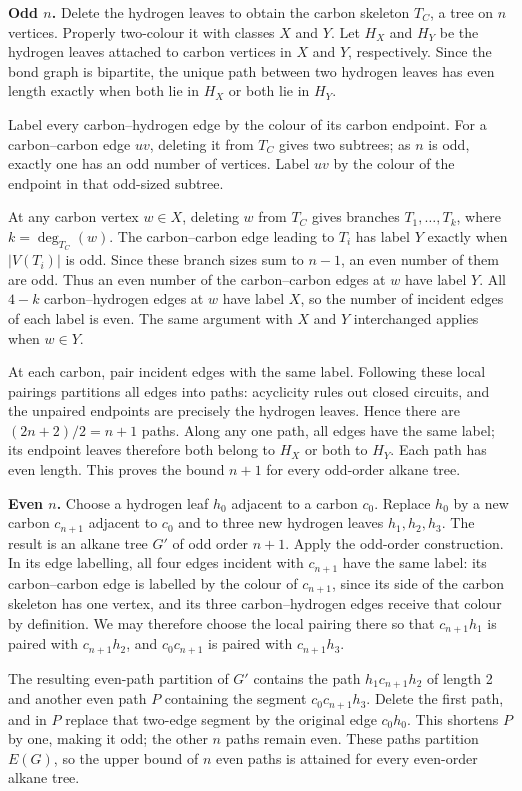 \textbf{Odd $n$.} Delete the hydrogen leaves to obtain the carbon skeleton $T_C$, a tree on $n$ vertices. Properly two-colour it with classes $X$ and $Y$. Let $H_X$ and $H_Y$ be the hydrogen leaves attached to carbon vertices in $X$ and $Y$, respectively. Since the bond graph is bipartite, the unique path between two hydrogen leaves has even length exactly when both lie in $H_X$ or both lie in $H_Y$.

Label every carbon--hydrogen edge by the colour of its carbon endpoint. For a carbon--carbon edge $uv$, deleting it from $T_C$ gives two subtrees; as $n$ is odd, exactly one has an odd number of vertices. Label $uv$ by the colour of the endpoint in that odd-sized subtree.

At any carbon vertex $w\in X$, deleting $w$ from $T_C$ gives branches $T_1,\ldots,T_k$, where $k=\deg_{T_C}(w)$. The carbon--carbon edge leading to $T_i$ has label $Y$ exactly when $|V(T_i)|$ is odd. Since these branch sizes sum to $n-1$, an even number of them are odd. Thus an even number of the carbon--carbon edges at $w$ have label $Y$. All $4-k$ carbon--hydrogen edges at $w$ have label $X$, so the number of incident edges of each label is even. The same argument with $X$ and $Y$ interchanged applies when $w\in Y$.

At each carbon, pair incident edges with the same label. Following these local pairings partitions all edges into paths: acyclicity rules out closed circuits, and the unpaired endpoints are precisely the hydrogen leaves. Hence there are $(2n+2)/2=n+1$ paths. Along any one path, all edges have the same label; its endpoint leaves therefore both belong to $H_X$ or both to $H_Y$. Each path has even length. This proves the bound $n+1$ for every odd-order alkane tree.

\textbf{Even $n$.} Choose a hydrogen leaf $h_0$ adjacent to a carbon $c_0$. Replace $h_0$ by a new carbon $c_{n+1}$ adjacent to $c_0$ and to three new hydrogen leaves $h_1,h_2,h_3$. The result is an alkane tree $G'$ of odd order $n+1$. Apply the odd-order construction. In its edge labelling, all four edges incident with $c_{n+1}$ have the same label: its carbon--carbon edge is labelled by the colour of $c_{n+1}$, since its side of the carbon skeleton has one vertex, and its three carbon--hydrogen edges receive that colour by definition. We may therefore choose the local pairing there so that $c_{n+1}h_1$ is paired with $c_{n+1}h_2$, and $c_0c_{n+1}$ is paired with $c_{n+1}h_3$.

The resulting even-path partition of $G'$ contains the path $h_1c_{n+1}h_2$ of length 2 and another even path $P$ containing the segment $c_0c_{n+1}h_3$. Delete the first path, and in $P$ replace that two-edge segment by the original edge $c_0h_0$. This shortens $P$ by one, making it odd; the other $n$ paths remain even. These paths partition $E(G)$, so the upper bound of $n$ even paths is attained for every even-order alkane tree.

